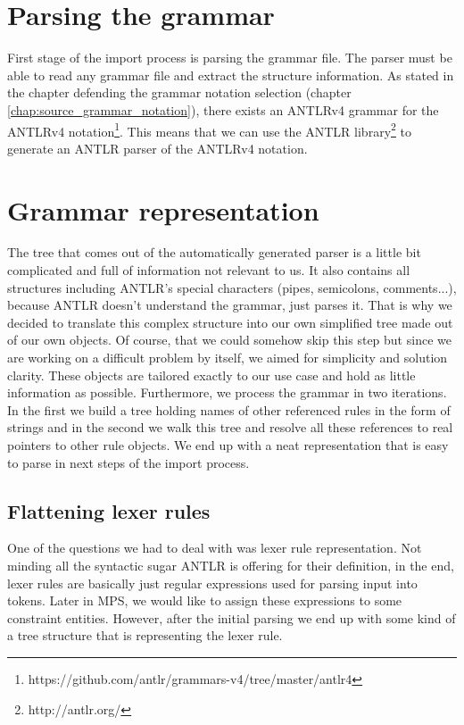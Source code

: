 \section{Parsing the grammar}

First stage of the import process is parsing the grammar file. The parser must be able to read any grammar file and extract the structure information. As stated in the chapter defending the grammar notation selection (chapter  \ref{chap:source_grammar_notation}), there exists an ANTLRv4 grammar for the ANTLRv4 notation\footnote{https://github.com/antlr/grammars-v4/tree/master/antlr4}. This means that we can use the ANTLR library\footnote{http://antlr.org/} to generate an ANTLR parser of the ANTLRv4 notation. 

\section{Grammar representation}

The tree that comes out of the automatically generated parser is a little bit complicated and full of information not relevant to us. It also contains all structures including ANTLR's special characters (pipes, semicolons, comments...), because ANTLR doesn't understand the grammar, just parses it. That is why we decided to translate this complex structure into our own simplified tree made out of our own objects. Of course, that we could somehow skip this step but since we are working on a difficult problem by itself, we aimed for simplicity and solution clarity. These objects are tailored exactly to our use case and hold as little information as possible. Furthermore, we process the grammar in two iterations. In the first we build a tree holding names of other referenced rules in the form of strings and in the second we walk this tree and resolve all these references to real pointers to other rule objects. We end up with a neat representation that is easy to parse in next steps of the import process.

\subsection{Flattening lexer rules}
One of the questions we had to deal with was lexer rule representation. Not minding all the syntactic sugar ANTLR is offering for their definition, in the end, lexer rules are basically just regular expressions used for parsing input into tokens. Later in MPS, we would like to assign these expressions to some constraint entities. However, after the initial parsing we end up with some kind of a tree structure that is representing the lexer rule. 

